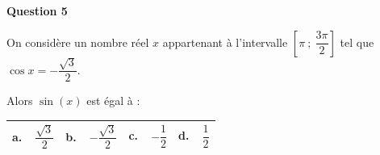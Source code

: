 \medskip

\textbf{Question 5}

\medskip

On considère un nombre réel $x$ appartenant à l'intervalle $\left[\pi~;~\dfrac{3\pi}{2}\right]$ tel que $\cos x = - \dfrac{\sqrt{3}}{2}$.

Alors $\sin (x)$ est égal à :

\begin{center}
\begin{tabularx}{\linewidth}{|*{4}{X|}}\hline
\textbf{a.~~}$\dfrac{\sqrt{3}}{2}$ &\textbf{b.~~}$-\dfrac{\sqrt{3}}{2}$&\textbf{c.~~}$-\dfrac{1}{2}$&\textbf{d.~~}$\dfrac{1}{2}$\rule[-3mm]{0mm}{9mm}\\ \hline
\end{tabularx}
\end{center}

\bigskip
